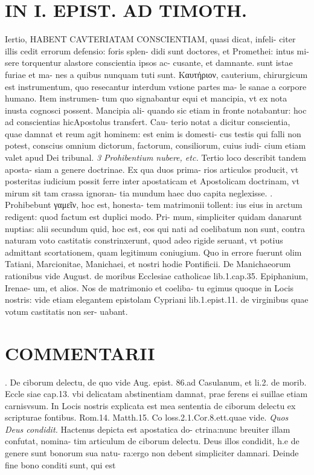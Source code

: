 \documentclass{article}
\begin{document}
\begin{pages}
\section*{IN I. EPIST. AD TIMOTH. }
\marginpar{[ p.89 ]}\pstart Iertio, HABENT CAVTERIATAM CONSCIENTIAM, quasi dicat, infeli- citer illis cedit errorum defensio: foris splen- didi sunt doctores, et Promethei: intus mi- sere torquentur alastore conscientia ipsos ac- cusante, et damnante. sunt istae furiae et ma- nes a quibus nunquam tuti sunt. Καυτήριον, cauterium, chirurgicum est instrumentum, quo resecantur interdum vstione partes ma- le sanae a corpore humano. Item instrumen- tum quo signabantur equi et mancipia, vt ex nota inusta cognosci possent. Mancipia ali- quando sic etiam in fronte notabantur: hoc ad conscientias hicApostolus transfert. Cau- terio notat a dicitur conscientia, quae damnat et reum agit hominem: est enim is domesti- cus testis qui falli non potest, conscius omnium dictorum, factorum, consiliorum, cuius iudi- cium etiam valet apud Dei tribunal.  \pend
\textit{3 Prohibentium nubere, etc. }\pstart Tertio loco describit tandem aposta- siam a genere doctrinae. Ex qua duos prima- rios articulos producit, vt posteritas iudicium possit ferre inter apostaticam et Apostolicam doctrinam, vt mirum sit tam crassa ignoran- tia mundum haec duo capita neglexisse.  \pend{}. Prohibebunt γαμεῖν, hoc est, honesta- tem matrimonii tollent: ius eius in arctum redigent: quod factum est duplici modo. Pri-  \pend
\marginpar{[ p.90 ]}\pstart mum, simpliciter quidam danarunt nuptias: alii secundum quid, hoc est, eos qui nati ad coelibatum non sunt, contra naturam voto castitatis constrinxerunt, quod adeo rigide seruant, vt potius admittant scortationem, quam legitimum coniugium. Quo in errore fuerunt olim Tatiani, Marcionitae, Manichaei, et nostri hodie Pontificii. De Manichaeorum rationibus vide August. de moribus Ecclesiae catholicae lib.1.cap.35. Epiphanium, Irenae- um, et alios. Nos de matrimonio et coeliba- tu egimus quoque in Locis nostris: vide etiam elegantem epistolam Cypriani lib.1.epist.11. de virginibus quae votum castitatis non ser- uabant.  \pend
\section*{COMMENTARII }. De ciborum delectu, de quo vide Aug. epist. 86.ad Casulanum, et li.2. de morib. Eccle siae cap.13. vbi delicatam abstinentiam damnat, prae ferens ei suillae etiam carnisvsum. In Locis nostris explicata est mea sententia de ciborum delectu ex scripturae fontibus. Rom.14. Matth.15. Co loss.2.1.Cor.8.ett.quae vide.  \pend
\textit{Quos Deus condidit. }\pstart Hactenus depicta est apostatica do- ctrina:nunc breuiter illam confutat, nomina- tim articulum de ciborum delectu. Deus illos condidit, h.e de genere sunt bonorum sua natu- ra:ergo non debent simpliciter damnari.  \pend\pstart Deinde fine bono conditi sunt, qui est  \pend

\end{pages}
\end{document}
